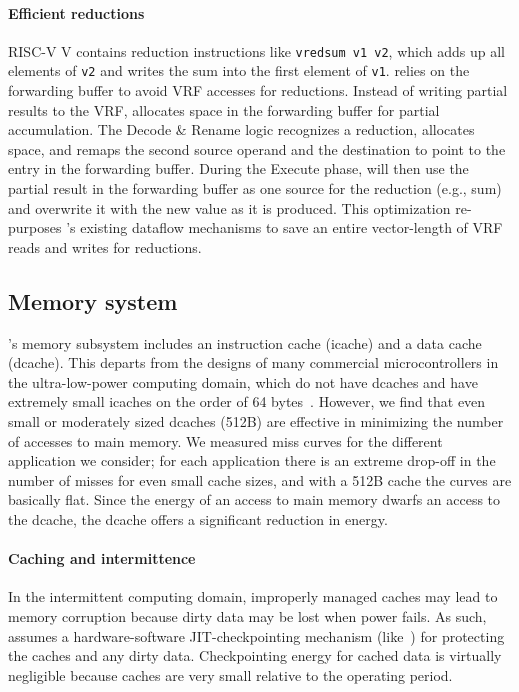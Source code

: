 \paragraph{Efficient reductions}
RISC-V V contains {reduction} instructions like \texttt{vredsum v1 v2},
which adds up all elements of \texttt{v2} and writes the sum into the first element of \texttt{v1}.
%
\manic relies on the forwarding buffer to avoid VRF accesses for reductions.
% 
Instead of writing partial results to the VRF,
\manic allocates space in the forwarding buffer for partial accumulation.
% 
The Decode \& Rename logic recognizes a reduction, allocates space, and remaps the second source operand and the destination to point to the entry in the forwarding buffer.
% 
During the Execute phase, \manic will then use the partial result in the forwarding buffer as one source for the reduction (e.g., sum)
and overwrite it with the new value as it is produced.
% 
This optimization re-purposes \manic's existing dataflow mechanisms
to save an entire vector-length of VRF reads and writes for reductions.

\subsection{Memory system}
\label{manic:manic:memory}
\manic's memory subsystem includes an instruction cache (icache) and a data cache (dcache).
%
This departs from the designs of many commercial microcontrollers 
in the ultra-low-power computing domain, which do
not have dcaches and have extremely small icaches on the order of 
64 bytes~\cite{msp430fr5994}.
%
However, we find that even small or moderately sized dcaches (512B) are effective in minimizing the number of accesses to main memory. 
%
We measured miss curves for the different application we consider; 
for each application there is an extreme drop-off in the number of misses for even 
small cache sizes,  and with a 512B cache the curves are basically flat.
%
Since the energy of an access to main memory dwarfs an access to the dcache,
the dcache offers a significant reduction in energy.

\paragraph{Caching and intermittence}
In the intermittent computing domain, improperly managed caches may
lead to memory corruption because dirty data may be lost when power fails.
%
As such, \manic assumes a hardware-software JIT-checkpointing mechanism
(like~\cite{hibernusplusplus, samoyed, quickrecall}) for protecting the caches
and any dirty data.
%
Checkpointing energy for cached data is virtually negligible because caches are
very small relative to the operating period. 
%

